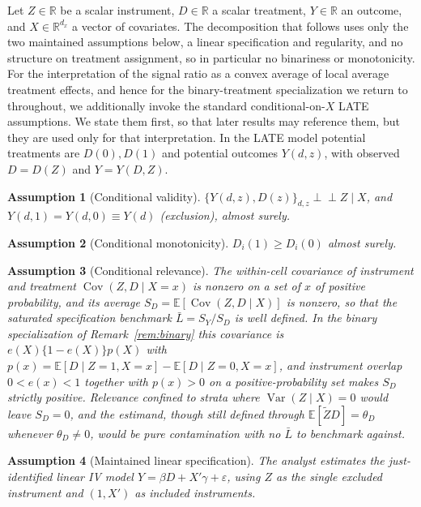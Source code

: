 \documentclass[preprint,11pt,authoryear]{elsarticle}
\newtheorem{assumption}{Assumption}
\theoremstyle{definition}
\newcommand{\E}{\mathbb{E}}
\newcommand{\Cov}{\operatorname{Cov}}
\newcommand{\Var}{\operatorname{Var}}
\newcommand{\Ztil}{\tilde{Z}}
\newcommand{\indep}{\perp\!\!\!\perp}
\begin{document}
Let $Z\in\mathbb{R}$ be a scalar instrument, $D\in\mathbb{R}$ a scalar treatment,
$Y\in\mathbb{R}$ an outcome, and $X\in\mathbb{R}^{d_x}$ a vector of covariates. The
decomposition that follows uses only the two maintained assumptions below, a linear
specification and regularity, and no structure on treatment assignment, so in
particular no binariness or monotonicity. For the interpretation of the signal
ratio as a convex average of local average treatment effects, and hence for the
binary-treatment specialization we return to throughout, we additionally invoke the
standard conditional-on-$X$ LATE assumptions. We state them first, so that later
results may reference them, but they are used only for that interpretation. In the
LATE model potential treatments are $D(0),D(1)$ and potential outcomes $Y(d,z)$, with
observed $D=D(Z)$ and $Y=Y(D,Z)$.

\begin{assumption}[Conditional validity]\label{as:valid}
$\{Y(d,z),D(z)\}_{d,z}\indep Z \mid X$, and $Y(d,1)=Y(d,0)\equiv Y(d)$
(exclusion), almost surely.
\end{assumption}

\begin{assumption}[Conditional monotonicity]\label{as:mono}
$D_i(1)\ge D_i(0)$ almost surely.
\end{assumption}

\begin{assumption}[Conditional relevance]\label{as:rel}
The within-cell covariance of instrument and treatment $\Cov(Z,D\mid X=x)$ is nonzero on a
set of $x$ of positive probability, and its average $S_D=\E[\Cov(Z,D\mid X)]$ is
nonzero, so that the saturated specification benchmark $\bar L=S_Y/S_D$ is well
defined. In the binary specialization of Remark~\ref{rem:binary} this covariance is
$e(X)\{1-e(X)\}p(X)$ with $p(x)=\E[D\mid Z=1,X=x]-\E[D\mid Z=0,X=x]$, and instrument
overlap $0<e(x)<1$ together with $p(x)>0$ on a positive-probability set makes $S_D$
strictly positive. Relevance confined to strata where $\Var(Z\mid X)=0$ would leave
$S_D=0$, and the estimand, though still defined through $\E[\Ztil D]=\theta_D$ whenever
$\theta_D\neq0$, would be pure contamination with no $\bar L$ to benchmark against.
\end{assumption}

\begin{assumption}[Maintained linear specification]\label{as:lin}
The analyst estimates the just-identified linear IV model
$Y=\beta D + X'\gamma + \varepsilon$, using $Z$ as the single excluded
instrument and $(1,X')$ as included instruments.
\end{assumption}
\end{document}
